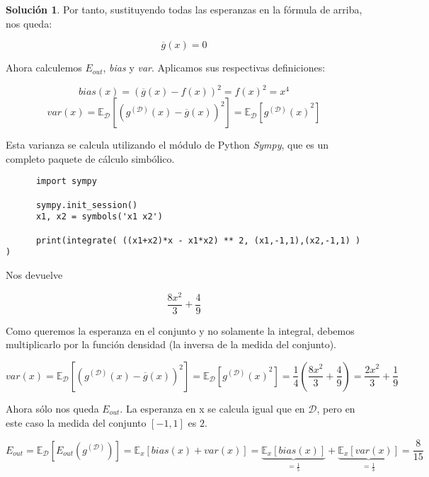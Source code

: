 \documentclass[a4paper, 11pt]{article}
\theoremstyle{definition}
\newtheorem*{solucion}{Solución}
\begin{document}
\begin{solucion}
    Por tanto, sustituyendo todas las esperanzas en la fórmula de arriba, nos queda:

    $$\overline{g}(x) = 0 $$

    Ahora calculemos $E_{out}$, \emph{bias} y \emph{var}. Aplicamos sus respectivas definiciones:

    $$ bias(x) = {(\overline{g}(x) - f(x))}^2 = f(x)^2 = x^4 $$
    $$ var(x) = \mathbb{E}_\mathcal{D}\left[ {(g^{(\mathcal{D})}(x) - \overline{g}(x) )}^2 \right] = \mathbb{E}_\mathcal{D}\left[ {g^{(\mathcal{D})}(x)}^2 \right] $$

    Esta varianza se calcula utilizando el módulo de Python \emph{Sympy}, que es un completo paquete de cálculo simbólico.

    \begin{lstlisting}
      import sympy

      sympy.init_session()
      x1, x2 = symbols('x1 x2')

      print(integrate( ((x1+x2)*x - x1*x2) ** 2, (x1,-1,1),(x2,-1,1) ) )
    \end{lstlisting}
    Nos devuelve

    $$ \frac{8 x^{2}}{3} + \frac{4}{9}$$

    Como queremos la esperanza en el conjunto y no solamente la integral, debemos multiplicarlo por la función densidad (la inversa de la medida del conjunto).

    $$var(x) = \mathbb{E}_\mathcal{D}\left[ {(g^{(\mathcal{D})}(x) - \overline{g}(x) )}^2 \right] = \mathbb{E}_\mathcal{D}\left[ {g^{(\mathcal{D})}(x)}^2 \right] = \frac{1}{4} \left(\frac{8 x^{2}}{3} + \frac{4}{9} \right) = \frac{2 x^{2}}{3} + \frac{1}{9}$$

    Ahora sólo nos queda $E_{out}$. La esperanza en x se calcula igual que en $\mathcal{D}$, pero en este caso la medida del conjunto $[-1,1]$ es $2$.

    $$ E_{out} = \mathbb{E}_\mathcal{D}\left[E_{out}(g^{(\mathcal{D})}) \right] = \mathbb{E}_x \left[ bias(x) + var(x)  \right] = \underbrace{\mathbb{E}_x \left[ bias(x) \right]}_{= \frac{1}{5}} + \underbrace{\mathbb{E}_x \left[ var(x)  \right]}_{=\frac{1}{3}} =  \frac{8}{15}$$

  \end{solucion}

\end{document}
